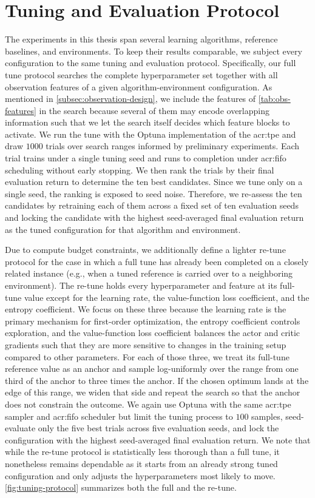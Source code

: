 \section{Tuning and Evaluation Protocol}
\label{sec:tuning-and-evaluation}
The experiments in this thesis span several learning algorithms, reference baselines, and environments. To keep their results comparable, we subject every configuration to the same tuning and evaluation protocol. Specifically, our full tune protocol searches the complete hyperparameter set together with all observation features of a given algorithm-environment configuration. As mentioned in \autoref{subsec:observation-design}, we include the features of \autoref{tab:obs-features} in the search because several of them may encode overlapping information such that we let the search itself decides which feature blocks to activate. We run the tune with the Optuna implementation of the \gls{acr:tpe} \citep{Bergstra2011, Akiba2019} and draw $1000$ trials over search ranges informed by preliminary experiments. Each trial trains under a single tuning seed and runs to completion under \gls{acr:fifo} scheduling without early stopping. We then rank the trials by their final evaluation return to determine the ten best candidates. Since we tune only on a single seed, the ranking is exposed to seed noise. Therefore, we re-assess the ten candidates by retraining each of them across a fixed set of ten evaluation seeds and locking the candidate with the highest seed-averaged final evaluation return as the tuned configuration for that algorithm and environment.

Due to compute budget constraints, we additionally define a lighter re-tune protocol for the case in which a full tune has already been completed on a closely related instance (e.g., when a tuned reference is carried over to a neighboring environment). The re-tune holds every hyperparameter and feature at its full-tune value except for the learning rate, the value-function loss coefficient, and the entropy coefficient. We focus on these three because the learning rate is the primary mechanism for first-order optimization, the entropy coefficient controls exploration, and the value-function loss coefficient balances the actor and critic gradients such that they are more sensitive to changes in the training setup compared to other parameters. For each of those three, we treat its full-tune reference value as an anchor and sample log-uniformly over the range from one third of the anchor to three times the anchor. If the chosen optimum lands at the edge of this range, we widen that side and repeat the search so that the anchor does not constrain the outcome. We again use Optuna with the same \gls{acr:tpe} sampler and \gls{acr:fifo} scheduler but limit the tuning process to $100$ samples, seed-evaluate only the five best trials across five evaluation seeds, and lock the configuration with the highest seed-averaged final evaluation return. We note that while the re-tune protocol is statistically less thorough than a full tune, it nonetheless remains dependable as it starts from an already strong tuned configuration and only adjusts the hyperparameters most likely to move. \autoref{fig:tuning-protocol} summarizes both the full and the re-tune.

